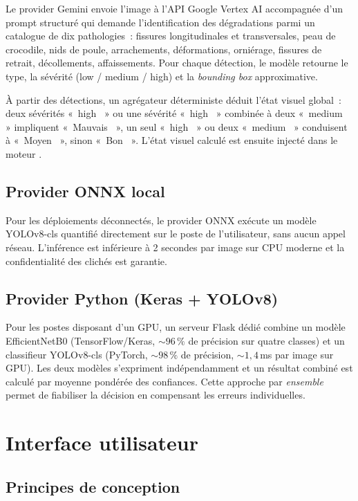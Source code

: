 Le provider Gemini envoie l'image à l'API Google Vertex AI accompagnée
d'un prompt structuré qui demande l'identification des dégradations
parmi un catalogue de dix pathologies~: fissures longitudinales et
transversales, peau de crocodile, nids de poule, arrachements,
déformations, orniérage, fissures de retrait, décollements,
affaissements. Pour chaque détection, le modèle retourne le type, la
sévérité (low / medium / high) et la \emph{bounding box} approximative.

À partir des détections, un agrégateur déterministe déduit l'état
visuel global~: deux sévérités «~high~ » ou une sévérité
«~high~ » combinée à deux «~medium~ » impliquent
«~Mauvais~ », un seul «~high~ » ou deux «~medium~ »
conduisent à «~Moyen~ », sinon «~Bon~ ». L'état visuel
calculé est ensuite injecté dans le moteur \cttp{}.

\subsection{Provider ONNX local}
\label{sec:onnx}

Pour les déploiements déconnectés, le provider ONNX exécute un modèle
YOLOv8-cls quantifié directement sur le poste de l'utilisateur, sans
aucun appel réseau. L'inférence est inférieure à 2 secondes par image
sur CPU moderne et la confidentialité des clichés est garantie.

\subsection{Provider Python (Keras + YOLOv8)}
\label{sec:python}

Pour les postes disposant d'un GPU, un serveur Flask dédié combine un
modèle EfficientNetB0 (TensorFlow/Keras, $\sim 96\,\%$ de précision sur
quatre classes) et un classifieur YOLOv8-cls (PyTorch, $\sim 98\,\%$
de précision, $\sim 1{,}4$\,ms par image sur GPU). Les deux modèles
s'expriment indépendamment et un résultat combiné est calculé par
moyenne pondérée des confiances. Cette approche par \emph{ensemble}
permet de fiabiliser la décision en compensant les erreurs
individuelles.


\section{Interface utilisateur}
\label{sec:ui}

\subsection{Principes de conception}
\label{sec:principes-ui}

